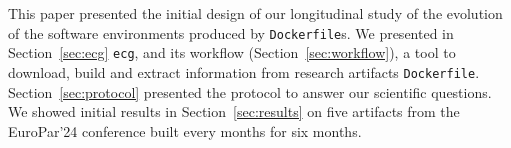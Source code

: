 \documentclass[sigconf,natbib=false]{acmart}
\newcommand{\ie}{\emph{i.e.,}}
\newcommand{\df}{\texttt{Dockerfile}}
\newcommand{\ecg}{\texttt{ecg}}
\begin{document}
% 
% 
% 
% 
% 
% 


This paper presented the initial design of our longitudinal study of the evolution of the software environments produced by \df s.
We presented in Section~\ref{sec:ecg} \ecg, and its workflow (Section~\ref{sec:workflow}), a tool to download, build and extract information from research artifacts \df.
Section~\ref{sec:protocol} presented the protocol to answer our scientific questions.
We showed initial results in Section~\ref{sec:results} on five artifacts from the EuroPar'24 conference built every months for six months.
\end{document}
